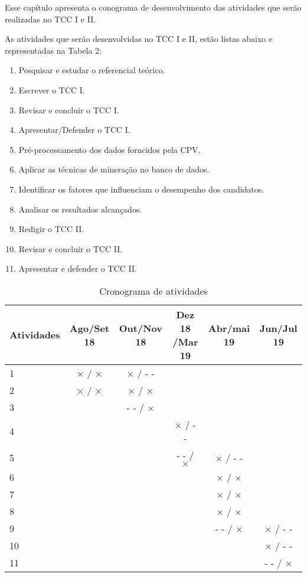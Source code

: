 \label{chapter:cronograma}

\par
Esse capítulo apresenta o conograma de desenvolvimento das atividades que serão realizadas no TCC I e II.

As atividades que serão desenvolvidas no TCC I e II, estão listas abaixo e representadas na Tabela 2:

\begin{enumerate}
  \item Pesquisar e estudar o referencial teórico.    
  \item Escrever o TCC I.
  \item Revisar e concluir o TCC I.
  \item Apresentar/Defender o TCC I.
  \item Pré-processamento dos dados forncidos pela CPV.
  \item Aplicar as técnicas de mineração no banco de dados.
  \item Identificar os fatores que influenciam o desempenho dos candidatos.
  \item Analisar os resultados alcançados. 
  \item Redigir o TCC II.
  \item Revisar e concluir o TCC II.
  \item Apresentar e defender o TCC II.
\end{enumerate}


\label{chapter:cronograma}
\begin{table}[htbp]
  \centering
  \caption{Cronograma de atividades}
  \label{tab:cronograma}
  \begin{tabularx}{\textwidth}{|X|c|c|c|c|c|}
    \hline
    \textbf{Atividades} & \textbf{Ago/Set 18} & \textbf{Out/Nov 18} & \textbf{Dez 18 /Mar 19} & \textbf{Abr/mai 19} & \textbf{Jun/Jul 19} \\
    \hline
    1 & \(\times\) / \(\times\) & \(\times\) / - - & & & \\
    \hline
    2 & \(\times\) / \(\times\) & \(\times\) / \(\times\) & & & \\
    \hline
    3 & & - - / \(\times\) &  & & \\
    \hline
    4 & & & \(\times\) / - - & &  \\
    \hline
    5 & & & - - / \(\times\) & \(\times\) / - - &  \\
    \hline
    6 & & &  & \(\times\) / \(\times\) & \\
    \hline
    7 & & & & \(\times\) / \(\times\) & \\
    \hline
    8 & & & & \(\times\) / \(\times\) & \\
    \hline
    9 & & & & - - / \(\times\) & \(\times\) / - - \\
    \hline
    10 & & & & & \(\times\) / - - \\
    \hline
    11 & & & &  & - - / \(\times\) \\
    \hline
  \end{tabularx}
\end{table}




